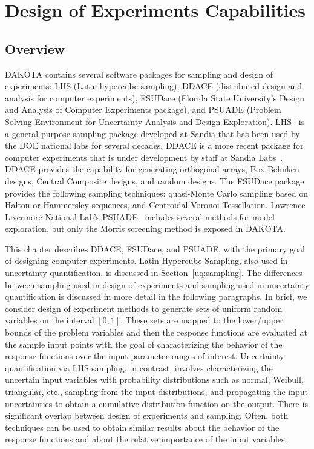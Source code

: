 \chapter{Design of Experiments Capabilities}\label{dace}

\section{Overview}\label{dace:overview}

DAKOTA contains several software packages for sampling and design of
experiments: LHS (Latin hypercube sampling), DDACE (distributed design
and analysis for computer experiments), FSUDace (Florida State
University's Design and Analysis of Computer Experiments package), and
PSUADE (Problem Solving Environment for Uncertainty Analysis and
Design Exploration).  LHS~\cite{Swi04} is a general-purpose sampling
package developed at Sandia that has been used by the DOE national
labs for several decades. DDACE is a more recent package for computer
experiments that is under development by staff at Sandia
Labs~\cite{TonXX}. DDACE provides the capability for generating
orthogonal arrays, Box-Behnken designs, Central Composite designs, and
random designs.  The FSUDace package provides the following sampling
techniques: quasi-Monte Carlo sampling based on Halton or Hammersley
sequences, and Centroidal Voronoi Tessellation.  Lawrence Livermore
National Lab's PSUADE~\cite{Ton05} includes several methods for model
exploration, but only the Morris screening method is exposed in DAKOTA.

This chapter describes DDACE, FSUDace, and PSUADE, with the primary
goal of designing computer experiments. Latin Hypercube Sampling, also
used in uncertainty quantification, is discussed in
Section~\ref{uq:sampling}.  The differences between sampling used in
design of experiments and sampling used in uncertainty quantification
is discussed in more detail in the following paragraphs. In brief, we
consider design of experiment methods to generate sets of uniform
random variables on the interval $[0,1]$. These sets are mapped to the
lower/upper bounds of the problem variables and then the response
functions are evaluated at the sample input points with the goal of
characterizing the behavior of the response functions over the input
parameter ranges of interest. Uncertainty quantification via LHS
sampling, in contrast, involves characterizing the uncertain input
variables with probability distributions such as normal, Weibull,
triangular, etc., sampling from the input distributions, and
propagating the input uncertainties to obtain a cumulative
distribution function on the output. There is significant overlap
between design of experiments and sampling. Often, both techniques can
be used to obtain similar results about the behavior of the response
functions and about the relative importance of the input variables.


